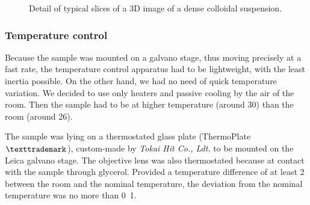 \begin{figure}
	\centering
	\quad
	\caption{Detail of typical slices of a 3D image of a dense colloidal suspension.}
	\label{fig:typical-slice}
\end{figure}



\subsubsection{Temperature control}
\label{subsubsec:Tcontrol}

Because the sample was mounted on a galvano stage, thus moving precisely at a fast rate, the temperature control apparatus had to be lightweight, with the least inertia possible. On the other hand, we had no need of quick temperature variation. We decided to use only heaters and passive cooling by the air of the room. Then the sample had to be at higher temperature (around \unit{30}{\celsius}) than the room (around \unit{26}{\celsius}).

The sample was lying on a thermostated glass plate (ThermoPlate$\texttrademark$), custom-made by \emph{Tokai Hit Co., Ldt.} to be mounted on the Leica galvano stage. The objective lens was also thermostated because at contact with the sample through glycerol. Provided a temperature difference of at least \unit{2}{\celsius} between the room and the nominal temperature, the deviation from the nominal temperature was no more than \unit{0.1}{\celsius}.

%
%